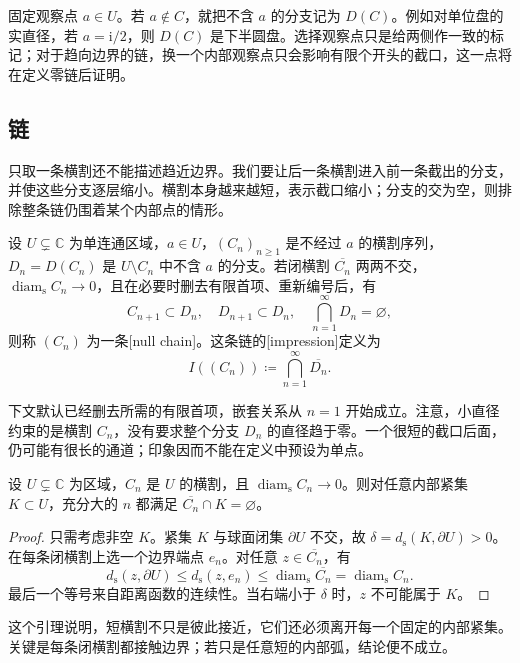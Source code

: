 \ProseParagraphBreak
固定观察点 \(a\in U\)。若 \(a\notin C\)，就把不含 \(a\) 的分支记为 \(D(C)\)。例如对单位盘的实直径，若 \(a=\mathrm i/2\)，则 \(D(C)\) 是下半圆盘。选择观察点只是给两侧作一致的标记；对于趋向边界的链，换一个内部观察点只会影响有限个开头的截口，这一点将在定义零链后证明。

\subsection{链}
\label{b3:subsec:070102}

只取一条横割还不能描述趋近边界。我们要让后一条横割进入前一条截出的分支，并使这些分支逐层缩小。横割本身越来越短，表示截口缩小；分支的交为空，则排除整条链仍围着某个内部点的情形。

\begin{definition}\label{b3:def:07-null-chain}
设 \(U\subsetneq\mathbb C\) 为单连通区域，\(a\in U\)，\((C_n)_{n\ge1}\) 是不经过 \(a\) 的横割序列，\(D_n=D(C_n)\) 是 \(U\setminus C_n\) 中不含 \(a\) 的分支。若闭横割 \(\overline{C_n}\) 两两不交，\(\operatorname{diam}_{\mathrm s}C_n\to0\)，且在必要时删去有限首项、重新编号后，有
\[
 C_{n+1}\subset D_n,\quad D_{n+1}\subset D_n,
 \quad \bigcap_{n=1}^{\infty}D_n=\varnothing,
\]
则称 \((C_n)\) 为一条[null chain]。这条链的[impression]定义为
\[
 I((C_n))\coloneqq\bigcap_{n=1}^{\infty}\overline{D_n}.
\]
\end{definition}
下文默认已经删去所需的有限首项，嵌套关系从 \(n=1\) 开始成立。注意，小直径约束的是横割 \(C_n\)，没有要求整个分支 \(D_n\) 的直径趋于零。一个很短的截口后面，仍可能有很长的通道；印象因而不能在定义中预设为单点。

\begin{lemma}\label{b3:lem:07-crosscuts-avoid-compact}
设 \(U\subsetneq\mathbb C\) 为区域，\(C_n\) 是 \(U\) 的横割，且 \(\operatorname{diam}_{\mathrm s}C_n\to0\)。则对任意内部紧集 \(K\subset U\)，充分大的 \(n\) 都满足 \(\overline{C_n}\cap K=\varnothing\)。
\end{lemma}
\begin{proof}
只需考虑非空 \(K\)。紧集 \(K\) 与球面闭集 \(\partial U\) 不交，故 \(\delta=d_{\mathrm s}(K,\partial U)>0\)。在每条闭横割上选一个边界端点 \(e_n\)。对任意 \(z\in\overline{C_n}\)，有
\[
 d_{\mathrm s}(z,\partial U)
 \le d_{\mathrm s}(z,e_n)
 \le\operatorname{diam}_{\mathrm s}\overline{C_n}
 =\operatorname{diam}_{\mathrm s}C_n.
\]
最后一个等号来自距离函数的连续性。当右端小于 \(\delta\) 时，\(z\) 不可能属于 \(K\)。
\end{proof}
这个引理说明，短横割不只是彼此接近，它们还必须离开每一个固定的内部紧集。关键是每条闭横割都接触边界；若只是任意短的内部弧，结论便不成立。

